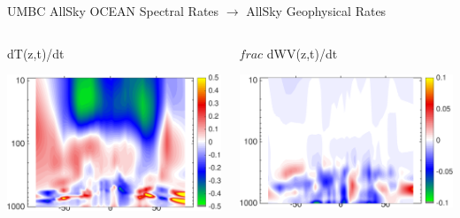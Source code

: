 \documentclass[10pt,t]{beamer}
\begin{document}
\begin{frame}{UMBC AllSky OCEAN Spectral Rates $\rightarrow$ AllSky Geophysical Rates}
\vspace{-0.35in}

\begin{columns}
\begin{column}{0.45\columnwidth}
\begin{block}{\footnotesize dT(z,t)/dt}
\vspace{-0.1in}
\begin{center}
\includegraphics[width=\linewidth]{Figs/CloudAnom/Desc_ocean/tz_lat_p_rates_from_obs_specral_rates.png}
\end{center}
\end{block}
\end{column}

\begin{column}{0.45\columnwidth}
\begin{block}{\footnotesize $frac$ dWV(z,t)/dt}
\vspace{-0.1in}
\begin{center}
\includegraphics[width=\linewidth]{Figs/CloudAnom/Desc_ocean/wv_lat_p_rates_from_obs_specral_rates.png}
\end{center}
\end{block}
\end{column}
\end{columns}


\end{frame}
\end{document}
